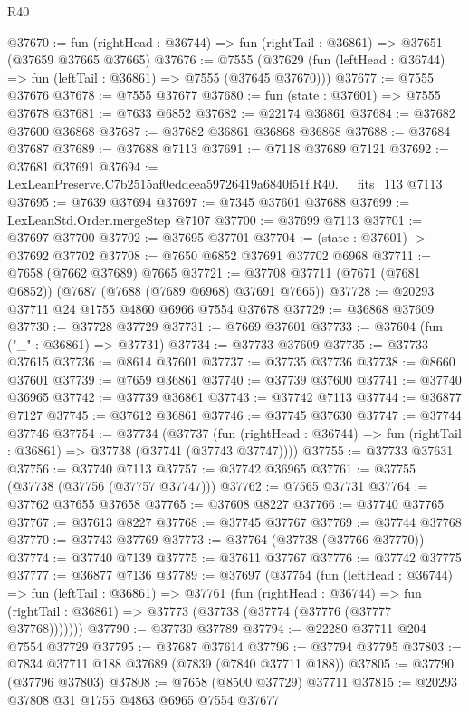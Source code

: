 \begin{lexlean}{R40}
\begin{coremodule}
@37670 := fun (rightHead : @36744) => fun (rightTail : @36861) => @37651 (@37659 @37665 @37665)
@37676 := @7555
    (@37629 (fun (leftHead : @36744) => fun (leftTail : @36861) => @7555 (@37645 @37670)))
@37677 := @7555 @37676
@37678 := @7555 @37677
@37680 := fun (state : @37601) => @7555 @37678
@37681 := @7633 @6852
@37682 := @22174 @36861
@37684 := @37682 @37600 @36868
@37687 := @37682 @36861 @36868 @36868
@37688 := @37684 @37687
@37689 := @37688 @7113
@37691 := @7118 @37689 @7121
@37692 := @37681 @37691
@37694 := LexLeanPreserve.C7b2515af0eddeea59726419a6840f51f.R40.__fits_113 @7113
@37695 := @7639 @37694
@37697 := @7345 @37601 @37688
@37699 := LexLeanStd.Order.mergeStep @7107
@37700 := @37699 @7113
@37701 := @37697 @37700
@37702 := @37695 @37701
@37704 := (state : @37601) -> @37692 @37702
@37708 := @7650 @6852 @37691 @37702 @6968
@37711 := @7658 (@7662 @37689) @7665
@37721 := @37708 @37711 (@7671 (@7681 @6852)) (@7687 (@7688 (@7689 @6968) @37691 @7665))
@37728 := @20293 @37711 @24 @1755 @4860 @6966 @7554 @37678
@37729 := @36868 @37609
@37730 := @37728 @37729
@37731 := @7669 @37601
@37733 := @37604 (fun ("_" : @36861) => @37731)
@37734 := @37733 @37609
@37735 := @37733 @37615
@37736 := @8614 @37601
@37737 := @37735 @37736
@37738 := @8660 @37601
@37739 := @7659 @36861
@37740 := @37739 @37600
@37741 := @37740 @36965
@37742 := @37739 @36861
@37743 := @37742 @7113
@37744 := @36877 @7127
@37745 := @37612 @36861
@37746 := @37745 @37630
@37747 := @37744 @37746
@37754 := @37734
    (@37737
      (fun (rightHead : @36744) => fun (rightTail : @36861) => @37738 (@37741 (@37743 @37747))))
@37755 := @37733 @37631
@37756 := @37740 @7113
@37757 := @37742 @36965
@37761 := @37755 (@37738 (@37756 (@37757 @37747)))
@37762 := @7565 @37731
@37764 := @37762 @37655 @37658
@37765 := @37608 @8227
@37766 := @37740 @37765
@37767 := @37613 @8227
@37768 := @37745 @37767
@37769 := @37744 @37768
@37770 := @37743 @37769
@37773 := @37764 (@37738 (@37766 @37770))
@37774 := @37740 @7139
@37775 := @37611 @37767
@37776 := @37742 @37775
@37777 := @36877 @7136
@37789 := @37697
    (@37754
      (fun (leftHead : @36744) =>
      fun (leftTail : @36861) =>
      @37761
        (fun (rightHead : @36744) =>
        fun (rightTail : @36861) => @37773 (@37738 (@37774 (@37776 (@37777 @37768)))))))
@37790 := @37730 @37789
@37794 := @22280 @37711 @204 @7554 @37729
@37795 := @37687 @37614
@37796 := @37794 @37795
@37803 := @7834 @37711 @188 @37689 (@7839 (@7840 @37711 @188))
@37805 := @37790 (@37796 @37803)
@37808 := @7658 (@8500 @37729) @37711
@37815 := @20293 @37808 @31 @1755 @4863 @6965 @7554 @37677

\end{coremodule}
\end{lexlean}
